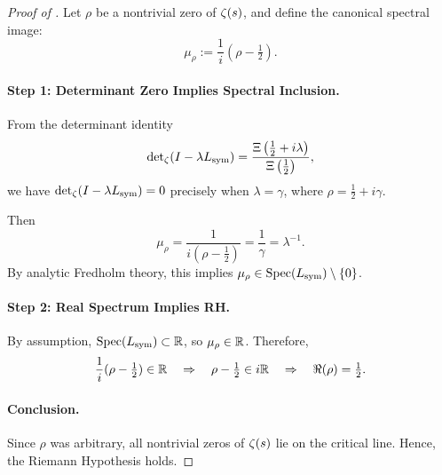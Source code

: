 \begin{proof}[Proof of ]
Let \( \rho \) be a nontrivial zero of \( \zeta(s) \), and define the canonical spectral image:
\[
\mu_\rho := \frac{1}{i}(\rho - \tfrac{1}{2}).
\]

\paragraph{Step 1: Determinant Zero Implies Spectral Inclusion.}
From the determinant identity
\[
\det\nolimits_\zeta(I - \lambda L_{\mathrm{sym}}) = \frac{\Xi\left( \tfrac{1}{2} + i\lambda \right)}{\Xi\left( \tfrac{1}{2} \right)},
\]
we have \( \det\nolimits_\zeta(I - \lambda L_{\mathrm{sym}}) = 0 \) precisely when \( \lambda = \gamma \), where \( \rho = \tfrac{1}{2} + i\gamma \).

Then
\[
\mu_\rho = \frac{1}{i(\rho - \tfrac{1}{2})} = \frac{1}{\gamma} = \lambda^{-1}.
\]
By analytic Fredholm theory, this implies \( \mu_\rho \in \operatorname{Spec}(L_{\mathrm{sym}}) \setminus \{0\} \).

\paragraph{Step 2: Real Spectrum Implies RH.}
By assumption, \( \operatorname{Spec}(L_{\mathrm{sym}}) \subset \mathbb{R} \), so \( \mu_\rho \in \mathbb{R} \). Therefore,
\[
\frac{1}{i}(\rho - \tfrac{1}{2}) \in \mathbb{R} \quad \Rightarrow \quad \rho - \tfrac{1}{2} \in i\mathbb{R} \quad \Rightarrow \quad \Re(\rho) = \tfrac{1}{2}.
\]

\paragraph{Conclusion.}
Since \( \rho \) was arbitrary, all nontrivial zeros of \( \zeta(s) \) lie on the critical line. Hence, the Riemann Hypothesis holds.
\end{proof}

